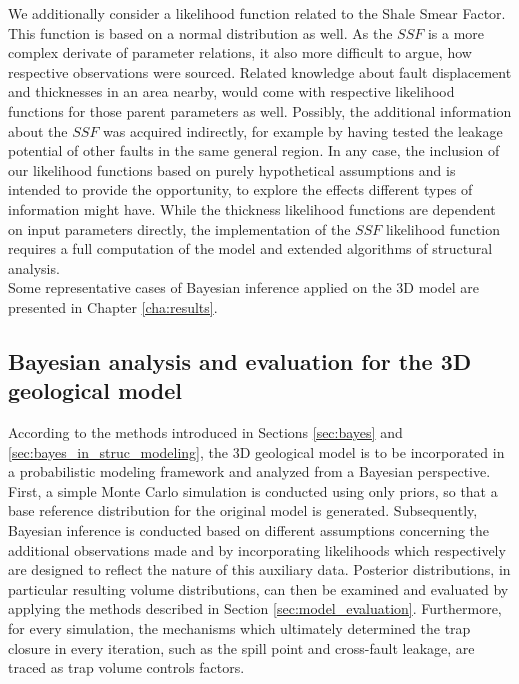 		We additionally consider a likelihood function related to the Shale Smear Factor. This function is based on a normal distribution as well. As the $SSF$ is a more complex derivate of parameter relations, it also more difficult to argue, how respective observations were sourced. Related knowledge about fault displacement and thicknesses in an area nearby, would come with respective likelihood functions for those parent parameters as well. Possibly, the additional information about the $SSF$ was acquired indirectly, for example by having tested the leakage potential of other faults in the same general region. In any case, the inclusion of our likelihood functions based on purely hypothetical assumptions and is intended to provide the opportunity, to explore the effects different types of information might have. While the thickness likelihood functions are dependent on input parameters directly, the implementation of the $SSF$ likelihood function requires a full computation of the model and extended algorithms of structural analysis.\\
		Some representative cases of Bayesian inference applied on the 3D model are presented in Chapter \ref{cha:results}.
		
		\subsection{Bayesian analysis and evaluation for the 3D geological model}
		According to the methods introduced in Sections \ref{sec:bayes} and \ref{sec:bayes_in_struc_modeling}, the 3D geological model is to be incorporated in a probabilistic modeling framework and analyzed from a Bayesian perspective.
		First, a simple Monte Carlo simulation is conducted using only priors, so that a base reference distribution for the original model is generated. Subsequently, Bayesian inference is conducted based on different assumptions concerning the additional observations made and by incorporating likelihoods which respectively are designed to reflect the nature of this auxiliary data. Posterior distributions, in particular resulting volume distributions, can then be examined and evaluated by applying the methods described in Section \ref{sec:model_evaluation}. Furthermore, for every simulation, the mechanisms which ultimately determined the trap closure in every iteration, such as the spill point and cross-fault leakage, are traced as trap volume controls factors. 
